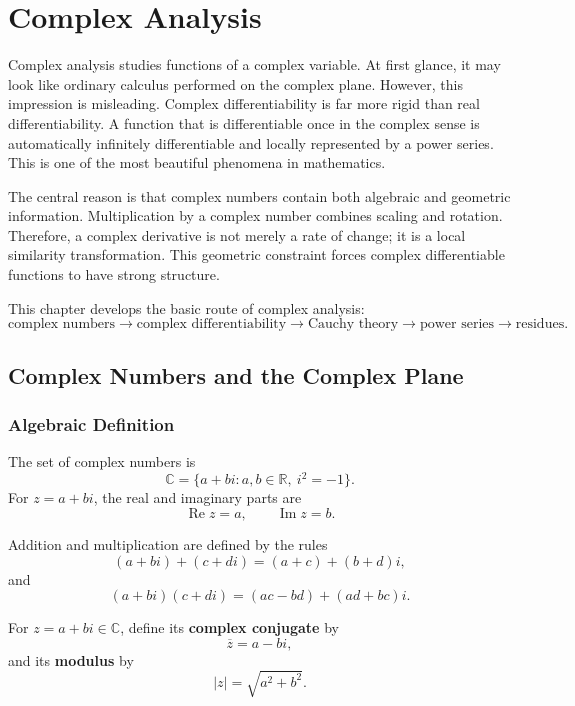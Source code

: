 \chapter{Complex Analysis}

Complex analysis studies functions of a complex variable. At first glance, it may look like ordinary calculus performed on the complex plane. However, this impression is misleading. Complex differentiability is far more rigid than real differentiability. A function that is differentiable once in the complex sense is automatically infinitely differentiable and locally represented by a power series. This is one of the most beautiful phenomena in mathematics.

The central reason is that complex numbers contain both algebraic and geometric information. Multiplication by a complex number combines scaling and rotation. Therefore, a complex derivative is not merely a rate of change; it is a local similarity transformation. This geometric constraint forces complex differentiable functions to have strong structure.

This chapter develops the basic route of complex analysis:
\[
    \text{complex numbers}\to\text{complex differentiability}\to\text{Cauchy theory}\to\text{power series}\to\text{residues}.
\]

\section{Complex Numbers and the Complex Plane}

\subsection{Algebraic Definition}

\begin{definition}
The set of complex numbers is
\[
    \mathbb{C}=\{a+bi:a,b\in\mathbb{R},\ i^2=-1\}.
\]
For $z=a+bi$, the real and imaginary parts are
\[
    \operatorname{Re}z=a,
    \qquad
    \operatorname{Im}z=b.
\]
\end{definition}

Addition and multiplication are defined by the rules
\[
    (a+bi)+(c+di)=(a+c)+(b+d)i,
\]
and
\[
    (a+bi)(c+di)=(ac-bd)+(ad+bc)i.
\]

\begin{definition}
For $z=a+bi\in\mathbb{C}$, define its \textbf{complex conjugate} by
\[
    \overline{z}=a-bi,
\]
and its \textbf{modulus} by
\[
    |z|=\sqrt{a^2+b^2}.
\]
\end{definition}

